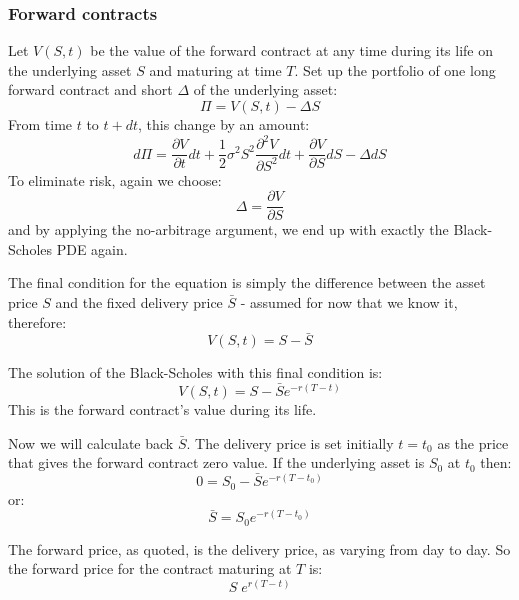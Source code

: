 \subsubsection{Forward contracts}
Let $V(S,t)$ be the value of the forward contract at any time during its life on the underlying asset $S$ and maturing at time $T$. Set up the portfolio of one long forward contract and short $\Delta$ of the underlying asset:
\begin{equation}
    \Pi = V(S,t) - \Delta S
\end{equation}
From time $t$ to $t+dt$, this change by an amount:
\begin{equation}
    d\Pi = \frac{\partial V}{\partial t} dt + \frac{1}{2} \sigma^2 S^2 \frac{\partial^2 V}{\partial S^2} dt + \frac{\partial V}{\partial S} dS - \Delta dS 
\end{equation}
To eliminate risk, again we choose:
\begin{equation}
    \Delta = \frac{\partial V}{\partial S}
\end{equation} 
and by applying the no-arbitrage argument, we end up with exactly the Black-Scholes PDE again.

The final condition for the equation is simply the difference between the asset price $S$ and the fixed delivery price $\bar{S}$ - assumed for now that we know it, therefore:
\begin{equation}
    V(S,t) = S - \bar{S}
\end{equation}

The solution of the Black-Scholes with this final condition is:
\begin{equation}
    V(S,t) = S - \bar{S} e^{-r(T-t)}
\end{equation}
This is the forward contract's value during its life. 

Now we will calculate back $\bar{S}$. The delivery price is set initially $t = t_0$ as the price that gives the forward contract zero value. If the underlying asset is $S_0$ at $t_0$ then:
\begin{equation}
    0 = S_0 - \bar{S} e^{-r(T-t_0)}
\end{equation}
or:
\begin{equation}
    \bar{S} = S_0 e^{-r(T-t_0)}
\end{equation}

The forward price, as quoted, is the delivery price, as varying from day to day. So the forward price for the contract maturing at $T$ is:
\begin{equation}
    S \; e^{r(T-t)}
\end{equation}



